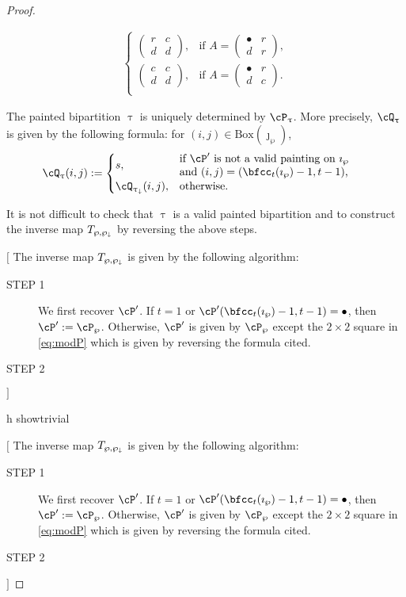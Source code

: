 \documentclass[12pt,a4paper]{amsart}
\newcommand{\trivial}[2][]{\if\relax\detokenize{#1}\relax
  {%
      \color{orange} \vspace{0em} $[$  #2 $]$
      \color{black}
  }
  \else
\ifx#1h
\ifcsname showtrivial\endcsname
{%
    \color{orange} \vspace{0em}  $[$ #2 $]$
    \color{black}
}
\fi
\else {\red Wrong argument!} \fi
\fi
}
\numberwithin{equation}{section}
\theoremstyle{remark}
\def\BOX#1{\mathrm{Box}(#1)}
\begin{document}
\begin{proof}
\begin{description}
\begin{itemize}
\begin{equation}
\begin{split}
\begin{cases}
                  \begin{pmatrix}
                    r & c\\
                    d & d
                  \end{pmatrix}, & \text{if } A =
                  \begin{pmatrix}
                    \bullet & r\\
                    d & r
                  \end{pmatrix},\\[1.5em]
                  \begin{pmatrix}
                    c & c\\
                    d & d
                  \end{pmatrix}, & \text{if } A =
                  \begin{pmatrix}
                    \bullet & r\\
                    d & c
                  \end{pmatrix}.\\
                \end{cases}
              \end{split}
            \end{equation}
          \end{itemize}

    \item[STEP 3] The painted bipartition $\uptau$ is uniquely determined by
          $\cP_{\uptau}$. More precisely, $\cQ_{\uptau}$ is given by the following
          formula: for $(i,j)\in \BOX{\jmath_{\wp}}$,
          \[
          \cQ_{\uptau}(i,j) :=
          \begin{cases}
            s, & \begin{minipage}{17em}if $\cP'$ is not a valid painting on $\imath_{\wp}$\\
              and $(i,j)= (\bfcc_{t}(\imath_{\wp})-1,t-1)$,
              \end{minipage}\\
            \cQ_{\uptaum}(i,j), & \text{otherwise.}
            \end{cases}
          \]
  \end{description}

 It is not difficult to check that $\uptau$ is a valid painted bipartition
 and to construct the inverse map $T_{\wp,\wp_{\downarrow}}$ by reversing the above steps.

 \trivial[]{
   The inverse map $T_{\wp,\wp_{\downarrow}}$ is given by the following algorithm:
   \begin{description}
     \item[STEP 1] We first recover $\cP'$.
           If $t=1$ or $\cP'(\bfcc_{t}(\imath_{\wp})-1,t-1)=\bullet$, then
           $\cP':= \cP_{\wp}$.
           Otherwise,
           $\cP'$ is given by $\cP_{\wp}$ except the $2\times 2$ square in
           \eqref{eq:modP} which is given by reversing the formula cited.
     \item[STEP 2]


\end{description}}
\end{proof}
\end{document}
